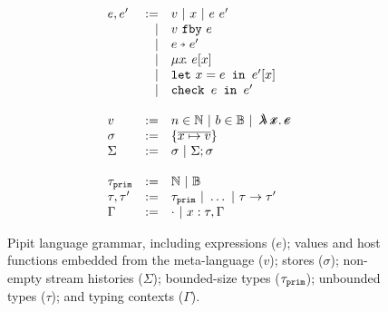 \begin{figure}
  \[
  \begin{array}{lrl}
    e, e' & := & v ~|~ x ~|~ e~e' \\
          & | & \xfby{v}{e} \\
          & | & \xthen{e}{e'} \\
          & | & \xrec{x}{e[x]} \\
          & | & \xlet{x}{e}{e'[x]} \\
          & | & \xcheck{e}{e'} \\
    \\
    v & := & n \in \mathbb{N} ~|~ b \in \mathbb{B} ~|~ \mlamX
    \\
    \sigma & := & \sgl{\ov{x \mapsto v}} \\
    \Sigma & := & \sigma ~|~ \Sigma;\sigma \\
      \\
    \primty & := & \mathbb{N} ~|~ \mathbb{B} \\
    \tau, \tau' & := & \primty ~|~ \hdots ~|~ \tau \to \tau' \\
    \Gamma & := & \cdot ~|~ x : \tau, \Gamma \\
    \end{array}
  \]
  \caption{Pipit language grammar, including expressions ($e$); values and host functions embedded from the \fstar{} meta-language ($v$); stores ($\sigma$); non-empty stream histories ($\Sigma$); bounded-size types ($\tau_{\texttt{prim}}$); unbounded types ($\tau$); and typing contexts ($\Gamma$).}
  \label{f:core-grammar}
\end{figure}
